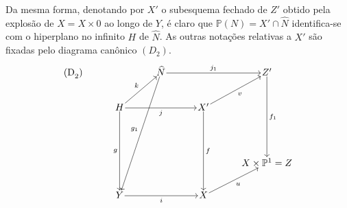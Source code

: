 Da mesma forma, denotando por $X'$ o subesquema fechado de $Z'$ obtido pela explosão de $X=X\times0$ ao longo de $Y$, é claro que $\mathbb P(N)=X'\cap\widehat N$ identifica-se com o hiperplano no infinito $H$ de $\widehat N$. As outras notações relativas a $X'$ são fixadas pelo diagrama canônico $(D_2)$.
\[
\begin{tikzcd}[column sep=3.2em,row sep=2.4em,cells={nodes={inner sep=1pt}}]
\text{(D}_2\text{)}\arrow[from=1-3,to=5-2,"g_1"']
& & \widehat N \arrow[rr,"j_1"] & & Z' \arrow[ddd,"f_1"] \\
& H \arrow[ur,"k"] \arrow[rr,"j"'] \arrow[ddd,"g"'] & &
X' \arrow[ur,"v"'] \arrow[ddd,"f"] & \\
& & & & \\
& & & & X\times\mathbb P^1=Z \\
& Y \arrow[rr,"i"'] & & X \arrow[ur,"u"'] &
\end{tikzcd}
\]
